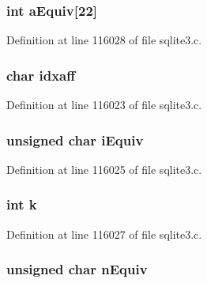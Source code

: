 \subsubsection[{a\+Equiv}]{\setlength{\rightskip}{0pt plus 5cm}int a\+Equiv\mbox{[}22\mbox{]}}\label{struct_where_scan_a23dc4d28864a6415c3fe5c438aeca8a0}


Definition at line 116028 of file sqlite3.\+c.

\hypertarget{struct_where_scan_ae76475c448181af3447663ec3bd7a380}{}
\subsubsection[{idxaff}]{\setlength{\rightskip}{0pt plus 5cm}char idxaff}\label{struct_where_scan_ae76475c448181af3447663ec3bd7a380}


Definition at line 116023 of file sqlite3.\+c.

\hypertarget{struct_where_scan_a4782a4c73d7d506bec711fb2f9cdf038}{}
\subsubsection[{i\+Equiv}]{\setlength{\rightskip}{0pt plus 5cm}unsigned char i\+Equiv}\label{struct_where_scan_a4782a4c73d7d506bec711fb2f9cdf038}


Definition at line 116025 of file sqlite3.\+c.

\hypertarget{struct_where_scan_ab66ed8e0098c0a86b458672a55a9cca9}{}
\subsubsection[{k}]{\setlength{\rightskip}{0pt plus 5cm}int k}\label{struct_where_scan_ab66ed8e0098c0a86b458672a55a9cca9}


Definition at line 116027 of file sqlite3.\+c.

\hypertarget{struct_where_scan_a6d050bc5818a694ffb5e5dda5e3b90e0}{}
\subsubsection[{n\+Equiv}]{\setlength{\rightskip}{0pt plus 5cm}unsigned char n\+Equiv}\label{struct_where_scan_a6d050bc5818a694ffb5e5dda5e3b90e0}


